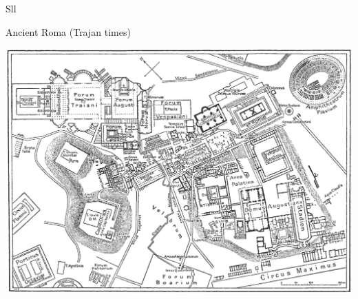 \documentclass[print,Draft]{faosyb}
\begin{document}
\begin{map}{S}{ll}
\caption{Ancient Roma  (Trajan times)}
\label{map:roma}
\includegraphics[width=\chartwidth,height=\chartheight]{Rome}
\end{map}
\end{document}
